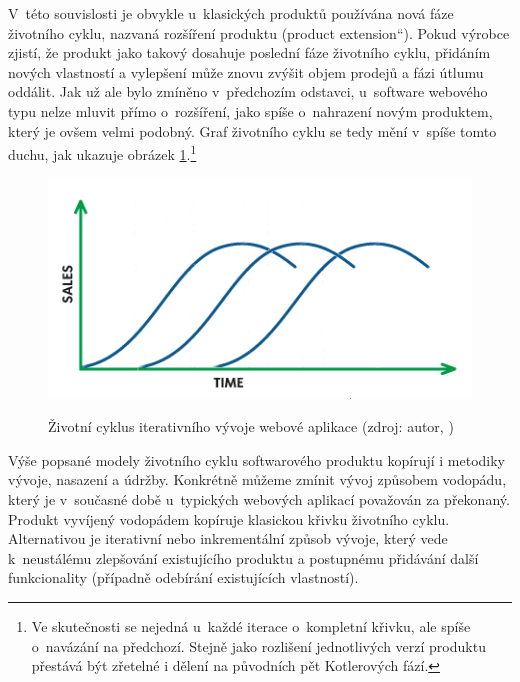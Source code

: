 \documentclass[12pt,twoside,openany]{fithesis}
\begin{document}
V~této souvislosti je obvykle u~klasických produktů používána nová fáze 
životního cyklu, nazvaná rozšíření produktu (\glqq product 
extension\textquotedblleft{}). Pokud výrobce zjistí, že produkt jako takový 
dosahuje poslední fáze životního cyklu, přidáním nových vlastností a 
vylepšení může znovu zvýšit objem prodejů a fázi útlumu oddálit. Jak 
už ale bylo zmíněno v~předchozím odstavci, u~software webového typu nelze 
mluvit přímo o~rozšíření, jako spíše o~nahrazení novým produktem, 
který je ovšem velmi podobný. Graf životního cyklu se tedy mění 
v~spíše tomto duchu, jak ukazuje obrázek 
\hyperlink{fig-product-lifecycle-sw}{{\ref{fig-product-lifecycle-sw}}}.\footnote{
    Ve skutečnosti se nejedná u~každé iterace o~kompletní křivku, ale 
spíše o~navázání na předchozí. Stejně jako rozlišení jednotlivých 
verzí produktu přestává být zřetelné i dělení na původních pět 
Kotlerových fází.}

\begin{figure}[hbt]
    \hypertarget{fig-product-lifecycle-sw}{}%
    \begin{center}

        
{{\includegraphics[]{img/product-lifecycle-sw}}\hypertarget{idp54873952}{}%
            \label{idp54873952}
        }
        {{\caption[{Životní cyklus iterativního vývoje webové 
aplikace}]{{{Životní cyklus iterativního vývoje webové 
aplikace (zdroj: autor, \cite{product-lifecycle-graph})}}}\label{fig-product-lifecycle-sw}}}
    \end{center}
\end{figure}

Výše popsané modely životního cyklu softwarového produktu kopírují i 
metodiky vývoje, nasazení a údržby. Konkrétně můžeme zmínit vývoj 
způsobem vodopádu, který je v~současné době u~typických webových 
aplikací považován za překonaný. \cite{waterfall}{} Produkt vyvíjený 
vodopádem kopíruje klasickou křivku životního cyklu. Alternativou je 
iterativní nebo inkrementální způsob vývoje, který vede k~neustálému 
zlepšování existujícího produktu a postupnému přidávání další 
funkcionality (případně odebírání existujících vlastností).
\end{document}
